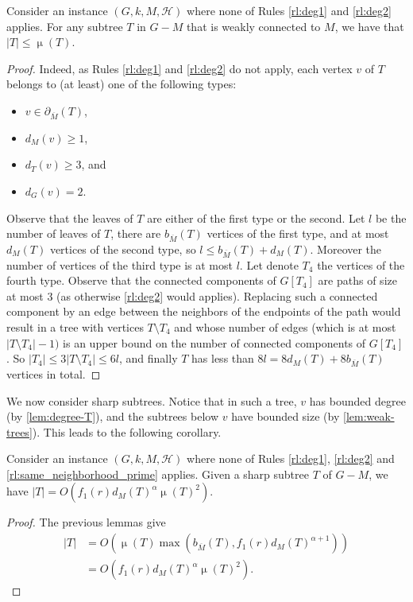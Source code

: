 \documentclass{amsart}
\newcommand{\pom}{\partial_{\overline{M}}}
\newcommand{\bom}{b_{\overline{M}}}
\newcommand{\mH}{\mathcal{H}}
\DeclareMathOperator\db{\mu}
\newcommand{\ruleref}[1]{\hyperref[#1]{\ref*{#1}}}
\begin{document}
\begin{lemma}\label{lem:weak-trees}
Consider an instance $(G,k,M,\mH)$ where none of Rules \ruleref{rl:deg1} and \ruleref{rl:deg2} applies. For any subtree $T$ in $G- M$ that is weakly connected to $M$, we have that $|T|\le \db(T)$.
\end{lemma}
\begin{proof}
Indeed, as Rules \ruleref{rl:deg1} and \ruleref{rl:deg2} do not apply, each vertex $v$ of $T$ belongs to (at least) one of the following types:\begin{itemize}
    \item $v\in\pom(T)$,
    \item $d_M(v)\ge 1$,
    \item $d_T(v)\ge 3$, and
    \item $d_G(v)= 2$.
\end{itemize}
Observe that the leaves of $T$ are either of the first type or the second. Let $l$ be the number of leaves of $T$, there are $\bom(T)$ vertices of the first type, and at most $d_M(T)$ vertices of the second type, so $l\leq \bom(T)+d_M(T)$. Moreover the number of vertices of the third type is at most $l$. Let denote $T_4$ the vertices of the fourth type. 
Observe that the connected components of $G[T_4]$ are paths of size at most $3$ (as otherwise \ruleref{rl:deg2} would applies). Replacing such a connected component by an edge between the neighbors of the endpoints of the path would result in a tree with vertices $T\setminus T_4$ and whose number of edges (which is at most $|T\setminus T_4|-1)$ is an upper bound on the number of connected components of $G[T_4]$. So $|T_4|\leq 3|T\setminus T_4|\leq 6l$, and finally $T$ has less than $8l=8d_M(T)+8\bom(T)$ vertices in total.
\end{proof}

We now consider sharp subtrees. Notice that in such a tree, $v$ has bounded degree (by \autoref{lem:degree-T}), and the subtrees below $v$ have bounded size (by \autoref{lem:weak-trees}). This leads to the following corollary.

\begin{corollary}\label{cor:sharpsize}
Consider an instance $(G,k,M,\mH)$ where none of Rules \ruleref{rl:deg1}, \ruleref{rl:deg2} and \ruleref{rl:same_neighborhood_prime} applies. Given a sharp subtree $T$ of $G-M$, we have $|T| = O\left(f_1(r)d_M(T)^\alpha\db(T)^2\right)$. 
\end{corollary}
\begin{proof}
    The previous lemmas give 
    \begin{align*}
        |T|&=O\left(\db(T)\max(\bom(T),f_1(r)d_M(T)^{\alpha+1})\right)\\
        &=O\left(f_1(r)d_M(T)^\alpha\db(T)^2\right).
    \end{align*}
\end{proof}
\end{document}
